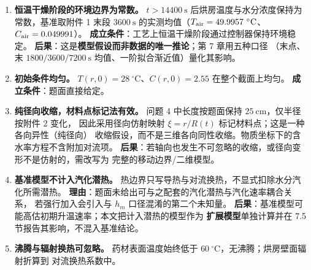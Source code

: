 \begin{enumerate}[leftmargin=2.4em,itemsep=0.35em]
\item \textbf{恒温干燥阶段的环境边界为常数。}
$t>14400\ \mathrm{s}$ 后烘房温度与水分浓度保持为常数，基准取附件 1 末段
$3600\ \mathrm{s}$ 的实测均值（$\Tair=49.9957\ ^\circ\mathrm{C}$、
$C_{\mathrm{air}}=0.049991$）。
\textbf{成立条件}：工艺上恒温干燥阶段通过控制器保持环境稳定。
\textbf{后果}：这是\textbf{模型假设而非数据的唯一推论}；第 7 章用五种口径
（末点、末 $1800/3600/7200\ \mathrm{s}$ 均值、一阶拟合渐近值）量化其影响。

\item \textbf{初始条件均匀。}
$T(r,0)=28\ ^\circ\mathrm{C}$、$C(r,0)=2.55$ 在整个截面上均匀。
\textbf{成立条件}：题面直接给定。

\item \textbf{纯径向收缩，材料点标记法有效。}
问题 4 中长度按题面保持 $25\ \mathrm{cm}$，仅半径按附件 2 变化，
因此采用径向仿射映射 $\xi=r/R(t)$ 标记材料点；这是一种各向异性（纯径向）
收缩假设，而不是三维各向同性收缩。物质坐标下的含水率方程不含附加对流项。
\textbf{后果}：若轴向也发生不可忽略的收缩，或径向变形不是仿射的，需改写为
完整的移动边界/二维模型。

\item \textbf{基准模型不计入汽化潜热。}
热边界只写导热与对流换热，不显式扣除水分汽化所需潜热。
\textbf{理由}：题面未给出可与之配套的汽化潜热与汽化速率耦合关系，
若强行加入会引入与 $h_m$ 口径混淆的第二个未知量。
\textbf{后果}：基准模型可能高估初期升温速率；本文把计入潜热的模型作为
\textbf{扩展模型}单独计算并在 7.5 节报告其影响，不混入基准结论。

\item \textbf{沸腾与辐射换热可忽略。}
药材表面温度始终低于 $60\ ^\circ\mathrm{C}$，无沸腾；烘房壁面辐射折算到
对流换热系数中。

\end{enumerate}
